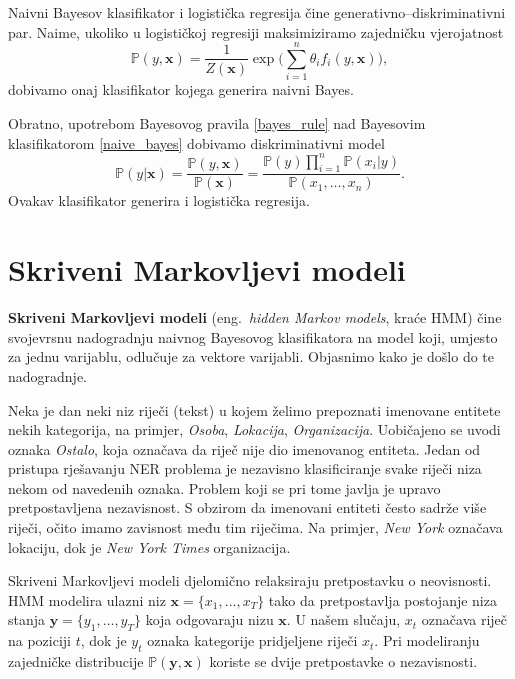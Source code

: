 \documentclass[a4paper,twoside,12pt]{memoir} %
\newcommand{\ti}[1]{\textit{#1\/}}
\newcommand{\tb}{\textbf}
\begin{document}
	Naivni Bayesov klasifikator i logistička regresija čine generativno--dis\-kri\-mi\-na\-tiv\-ni par. Naime, ukoliko u logističkoj regresiji maksimiziramo zajedničku vjerojatnost
	\begin{equation*}
	\mathbb{P}(y, \mathbf{x}) = \frac{1}{Z(\mathbf{x})} \exp \bigg(\sum_{i=1}^{n} \theta_i f_i(y, \mathbf{x})\bigg),
	\end{equation*}
	dobivamo onaj klasifikator kojega generira naivni Bayes.

	Obratno, upotrebom Bayesovog pravila \eqref{bayes_rule} nad Bayesovim klasifikatorom \eqref{naive_bayes} dobivamo diskriminativni model
	\begin{equation*}
	\mathbb{P}(y | \mathbf{x}) = \frac{\mathbb{P}(y, \mathbf{x})} {\mathbb{P}(\mathbf{x})} = \frac{\mathbb{P}(y) \prod_{i=1}^{n}\mathbb{P}(x_i|y)} {\mathbb{P}(x_1, \ldots, x_n)}.
	\end{equation*}
	Ovakav klasifikator generira i logistička regresija.


	\section{Skriveni Markovljevi modeli}

	\tb{Skriveni Markovljevi modeli} (eng.~\ti{hidden Markov models}, kraće HMM) čine svojevrsnu nadogradnju naivnog Bayesovog klasifikatora na model koji, umjesto za jednu varijablu, odlučuje za vektore varijabli. Objasnimo kako je došlo do te nadogradnje.

	Neka je dan neki niz riječi (tekst) u kojem želimo prepoznati imenovane entitete nekih kategorija, na primjer, \ti{Osoba}, \ti{Lokacija}, \ti{Organizacija}. Uobičajeno se uvodi oznaka \ti{Ostalo}, koja označava da riječ nije dio imenovanog entiteta. Jedan od pristupa rješavanju NER problema je nezavisno klasificiranje svake riječi niza nekom od navedenih oznaka. Problem koji se pri tome javlja je upravo pretpostavljena nezavisnost. S obzirom da imenovani entiteti često sadrže više riječi, očito imamo zavisnost među tim riječima. Na primjer, \ti{New York} označava lokaciju, dok je \ti{New York Times} organizacija.

	Skriveni Markovljevi modeli djelomično relaksiraju pretpostavku o neovisnosti. HMM modelira ulazni niz $\mathbf{x} = \{x_1, \ldots, x_T\}$ tako da pretpostavlja postojanje niza stanja $\mathbf{y} = \{y_1, \ldots, y_T\}$ koja odgovaraju nizu $\mathbf{x}$. U našem slučaju, $x_t$ označava riječ na poziciji $t$, dok je $y_t$ oznaka kategorije pridjeljene riječi $x_t$. Pri modeliranju zajedničke distribucije $\mathbb{P}(\mathbf{y}, \mathbf{x})$ koriste se dvije pretpostavke o nezavisnosti.
\end{document}
